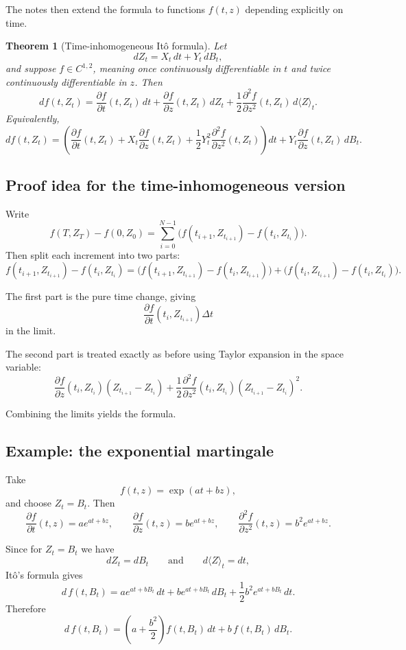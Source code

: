 \documentclass[11pt]{article}
\newtheorem{theorem}{Theorem}[section]
\theoremstyle{definition}
\begin{document}
The notes then extend the formula to functions \(f(t,z)\) depending explicitly on time.

\begin{theorem}[Time-inhomogeneous It\^o formula]
Let
\[
dZ_t=X_t\,dt+Y_t\,dB_t,
\]
and suppose \(f\in C^{1,2}\), meaning once continuously differentiable in \(t\) and twice continuously differentiable in \(z\). Then
\[
df(t,Z_t)
=
\frac{\partial f}{\partial t}(t,Z_t)\,dt
+
\frac{\partial f}{\partial z}(t,Z_t)\,dZ_t
+
\frac12\frac{\partial^2 f}{\partial z^2}(t,Z_t)\,d\langle Z\rangle_t.
\]
Equivalently,
\[
df(t,Z_t)
=
\left(
\frac{\partial f}{\partial t}(t,Z_t)
+
X_t\frac{\partial f}{\partial z}(t,Z_t)
+
\frac12 Y_t^2\frac{\partial^2 f}{\partial z^2}(t,Z_t)
\right)dt
+
Y_t\frac{\partial f}{\partial z}(t,Z_t)\,dB_t.
\]
\end{theorem}

\subsection{Proof idea for the time-inhomogeneous version}

Write
\[
f(T,Z_T)-f(0,Z_0)
=
\sum_{i=0}^{N-1}\bigl(f(t_{i+1},Z_{t_{i+1}})-f(t_i,Z_{t_i})\bigr).
\]
Then split each increment into two parts:
\[
f(t_{i+1},Z_{t_{i+1}})-f(t_i,Z_{t_i})
=
\bigl(f(t_{i+1},Z_{t_{i+1}})-f(t_i,Z_{t_{i+1}})\bigr)
+
\bigl(f(t_i,Z_{t_{i+1}})-f(t_i,Z_{t_i})\bigr).
\]

The first part is the pure time change, giving
\[
\frac{\partial f}{\partial t}(t_i,Z_{t_{i+1}})\Delta t
\]
in the limit.

The second part is treated exactly as before using Taylor expansion in the space variable:
\[
\frac{\partial f}{\partial z}(t_i,Z_{t_i})(Z_{t_{i+1}}-Z_{t_i})
+
\frac12
\frac{\partial^2 f}{\partial z^2}(t_i,Z_{t_i})(Z_{t_{i+1}}-Z_{t_i})^2.
\]

Combining the limits yields the formula.

\subsection{Example: the exponential martingale}

Take
\[
f(t,z)=\exp(at+bz),
\]
and choose \(Z_t=B_t\). Then
\[
\frac{\partial f}{\partial t}(t,z)=a e^{at+bz},
\qquad
\frac{\partial f}{\partial z}(t,z)=b e^{at+bz},
\qquad
\frac{\partial^2 f}{\partial z^2}(t,z)=b^2 e^{at+bz}.
\]

Since for \(Z_t=B_t\) we have
\[
dZ_t=dB_t
\qquad\text{and}\qquad
d\langle Z\rangle_t=dt,
\]
It\^o's formula gives
\[
d\,f(t,B_t)
=
a e^{at+bB_t}\,dt
+
b e^{at+bB_t}\,dB_t
+
\frac12 b^2 e^{at+bB_t}\,dt.
\]
Therefore
\[
d\,f(t,B_t)
=
\left(a+\frac{b^2}{2}\right)f(t,B_t)\,dt
+
b\,f(t,B_t)\,dB_t.
\]
\end{document}
